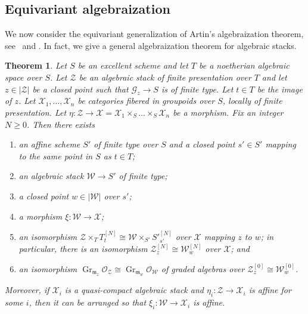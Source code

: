 \documentclass[a4paper]{amsart}
\theoremstyle{plain}
\newtheorem{theorem}{Theorem}[section]
\theoremstyle{definition}
\theoremstyle{remark}
\numberwithin{equation}{section}
\DeclareMathOperator{\Gr}{Gr} %
\newcommand{\fm}{\mathfrak{m}}
\newcommand\cG{\mathcal{G}}
\newcommand\cW{\mathcal{W}}
\newcommand\cX{\mathcal{X}}
\newcommand\cZ{\mathcal{Z}}
\newcommand\oh{\mathcal{O}}
\newcommand\co{\colon}
\begin{document}

\subsection{Equivariant algebraization}
We now consider the equivariant generalization of Artin's algebraization
theorem, see~\cite[Thm.~1.6]{artin-algebraization} and
\cite[Thm.~1.5, Rem.~1.7]{conrad-dejong}. In fact, we give a general
algebraization theorem for algebraic stacks.

\begin{theorem}\label{T:approximate-algebraization}
Let $S$ be an excellent scheme and let $T$ be a noetherian algebraic space over
$S$. Let $\cZ$ be an algebraic stack of finite presentation over $T$ and let
$z\in |\cZ|$ be a closed point such that $\cG_z\to S$ is of finite type.  Let $t \in T$ be the image of $z$.  Let
$\cX_1,\dots,\cX_n$ be categories fibered in groupoids over $S$, locally of finite presentation. Let $\eta\co \cZ \to
\cX=\cX_1\times_S\dots \times_S \cX_n$ be a morphism. Fix an integer $N\geq 0$. Then there exists
\begin{enumerate}
\item\label{TI:approx-first}
  an affine scheme $S'$ of finite type over $S$ and a closed point $s' \in S'$ mapping to the same point in $S$ as $t \in T$;
\item an algebraic stack $\cW \to S'$ of finite type;
\item a closed point $w\in |\cW|$ over $s'$;
\item a morphism $\xi\co \cW \to \cX$;
\item\label{TI:approx-last}
  an isomorphism $\cZ \times_T T^{[N]}_t \cong \cW \times_{S'} S'^{[N]}_{s'}$ over $\cX$ mapping $z$ to $w$; 
in particular, there is an isomorphism $\cZ^{[N]}_z\cong \cW^{[N]}_w$ over $\cX$; and
\item\label{TI:approx-graded-iso}
  an isomorphism $\Gr_{\fm_z}\oh_{\cZ}\cong \Gr_{\fm_w}\oh_{\cW}$ of
graded algebras over $\cZ^{[0]}_z\cong \cW^{[0]}_w$.
\end{enumerate}
Moreover, if $\cX_i$ is a quasi-compact algebraic stack and $\eta_i\co \cZ \to
\cX_i$ is affine for some $i$, then it can be arranged so that $\xi_i \co
\cW \to \cX_i$ is affine.
\end{theorem}
\end{document}
